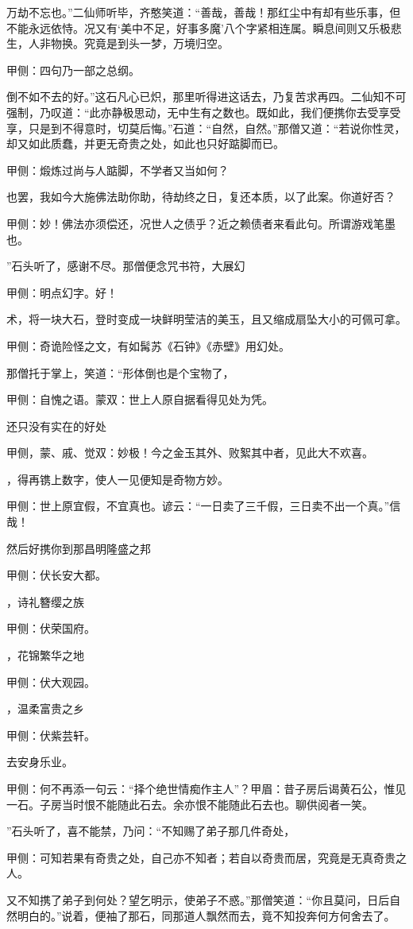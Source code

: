 \begin{parag}
万劫不忘也。”二仙师听毕，齐憨笑道：“善哉，善哉！那红尘中有却有些乐事，但不能永远依恃。况又有‘美中不足，好事多魔’八个字紧相连属。瞬息间则又乐极悲生，人非物换。究竟是到头一梦，万境归空。\begin{note}甲侧：四句乃一部之总纲。\end{note}倒不如不去的好。”这石凡心已炽，那里听得进这话去，乃复苦求再四。二仙知不可强制，乃叹道：“此亦静极思动，无中生有之数也。既如此，我们便携你去受享受享，只是到不得意时，切莫后悔。”石道：“自然，自然。”那僧又道：“若说你性灵，却又如此质蠢，并更无奇贵之处，如此也只好踮脚而已。\begin{note}甲侧：煅炼过尚与人踮脚，不学者又当如何？\end{note}也罢，我如今大施佛法助你助，待劫终之日，复还本质，以了此案。你道好否？\begin{note}甲侧：妙！佛法亦须偿还，况世人之债乎？近之赖债者来看此句。所谓游戏笔墨也。\end{note}”石头听了，感谢不尽。那僧便念咒书符，大展幻\begin{note}甲侧：明点幻字。好！\end{note}术，将一块大石，登时变成一块鲜明莹洁的美玉，且又缩成扇坠大小的可佩可拿。\begin{note}甲侧：奇诡险怪之文，有如髯苏《石钟》《赤壁》用幻处。\end{note}那僧托于掌上，笑道：“形体倒也是个宝物了，\begin{note}甲侧：自愧之语。蒙双：世上人原自据看得见处为凭。\end{note}还只没有实在的好处\begin{note}甲侧，蒙、戚、觉双：妙极！今之金玉其外、败絮其中者，见此大不欢喜。\end{note}，得再镌上数字，使人一见便知是奇物方妙。\begin{note}甲侧：世上原宜假，不宜真也。谚云：“一日卖了三千假，三日卖不出一个真。”信哉！\end{note}然后好携你到那昌明隆盛之邦\begin{note}甲侧：伏长安大都。\end{note}，诗礼簪缨之族\begin{note}甲侧：伏荣国府。\end{note}，花锦繁华之地\begin{note}甲侧：伏大观园。\end{note}，温柔富贵之乡\begin{note}甲侧：伏紫芸轩。\end{note}去安身乐业。\begin{note}甲侧：何不再添一句云：“择个绝世情痴作主人”？甲眉：昔子房后谒黄石公，惟见一石。子房当时恨不能随此石去。余亦恨不能随此石去也。聊供阅者一笑。\end{note}”石头听了，喜不能禁，乃问：“不知赐了弟子那几件奇处，\begin{note}甲侧：可知若果有奇贵之处，自己亦不知者；若自以奇贵而居，究竟是无真奇贵之人。\end{note}又不知携了弟子到何处？望乞明示，使弟子不惑。”那僧笑道：“你且莫问，日后自然明白的。”说着，便袖了那石，同那道人飘然而去，竟不知投奔何方何舍去了。

\end{parag}


